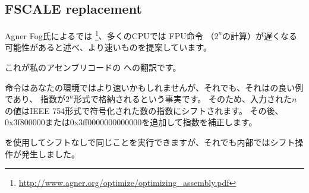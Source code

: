 ﻿\subsection{FSCALE replacement}

Agner Fog氏によるでは
\footnote{\url{http://www.agner.org/optimize/optimizing_assembly.pdf}}、多くのCPUでは \ac{FPU}命令
（$2^n$の計算）が遅くなる可能性があると述べ、より速いものを提案しています。

これが私のアセンブリコードの \CCpp への翻訳です。



命令はあなたの環境ではより速いかもしれませんが、それでも、それはの良い例であり、
指数が$2^n$形式で格納されるという事実です。
そのため、入力された$n$の値はIEEE 754形式で符号化された数の指数にシフトされます。
その後、0x3f800000または0x3ff0000000000000を追加して指数を補正します。

を使用してシフトなしで同じことを実行できますが、それでも内部ではシフト操作が発生しました。
